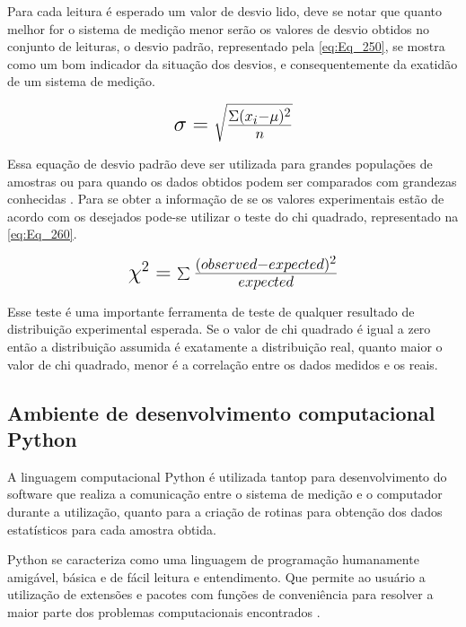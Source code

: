 \hfill

Para cada leitura é esperado um valor de desvio lido, deve se notar que quanto melhor for o sistema de medição menor serão os valores de desvio obtidos no conjunto de
leituras, o desvio padrão, representado pela \autoref{eq:Eq_250}, se mostra como um bom indicador da situação dos desvios, e consequentemente da exatidão de um sistema de
medição.

\begin{equation}\label{eq:Eq_250}%
\mbox{\fontsize{17.28}{21.6}\selectfont\( %
\sigma = \sqrt{\frac{\Sigma(x_i-\mu)^{2}}{n}}
\)} %
\end{equation}

\hfill

Essa equação de desvio padrão deve ser utilizada para grandes populações de amostras ou para quando os dados obtidos podem ser comparados com grandezas
conhecidas \autocite{Hollman2011}. Para se obter a informação de se os valores experimentais estão de acordo com os desejados pode-se utilizar o teste do chi quadrado,
representado na \autoref{eq:Eq_260}.

\begin{equation}\label{eq:Eq_260}%
\mbox{\fontsize{17.28}{21.6}\selectfont\( %
\chi^{2} = \sum{\frac{(observed - expected)^{2}}{expected}}
\)} %
\end{equation}

\hfill

Esse teste é uma importante ferramenta de teste de qualquer resultado de distribuição experimental esperada. Se o valor de chi quadrado é igual a zero
então a distribuição assumida é exatamente a distribuição real, quanto maior o valor de chi quadrado, menor é a correlação entre os dados medidos e os reais. \autocite{Hollman2011}

\subsection{Ambiente de desenvolvimento computacional Python}

A linguagem computacional Python é utilizada tantop para desenvolvimento do software que realiza a comunicação entre o sistema de medição e o computador durante a utilização,
quanto para a criação de rotinas para obtenção dos dados estatísticos para cada amostra obtida.

Python se caracteriza como uma linguagem de programação humanamente amigável, básica e de fácil leitura e entendimento.
Que permite ao usuário a utilização de extensões e pacotes com funções de conveniência para resolver a maior parte dos problemas computacionais encontrados \autocite{TimHall2010}.


